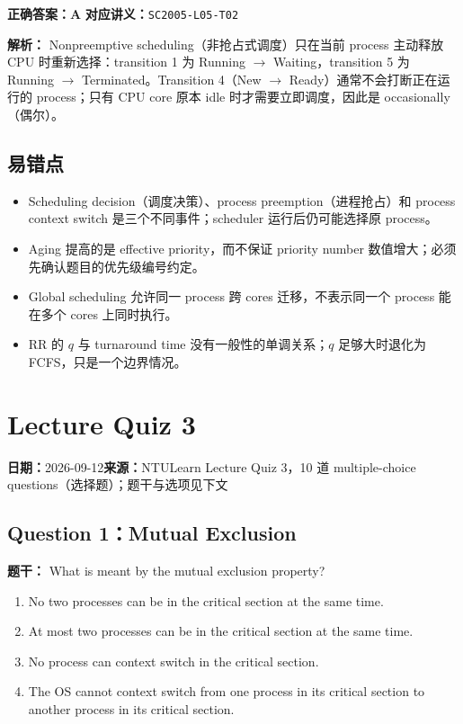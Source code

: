 \documentclass[11pt,a4paper,fontset=fandol]{ctexart}
\renewcommand{\exercisequestion}[2]{%
  \Needspace{5\baselineskip}%
  \subsection{#2}\label{exercise:#1}%
}
\renewcommand{\exercisemeta}[5]{%
  {\small\textbf{日期：}#2\quad\textbf{来源：}#3\par}%
}
\renewenvironment{checkedsolution}
  {\par\nopagebreak[4]\textbf{解析：}\ignorespaces}
  {\par}
\begin{document}
\textbf{正确答案：A}\qquad
\textbf{对应讲义：}\texttt{SC2005-L05-T02}

\begin{checkedsolution}
Nonpreemptive scheduling（非抢占式调度）只在当前 process 主动释放 CPU 时重新选择：transition 1 为 Running $\rightarrow$ Waiting，transition 5 为 Running $\rightarrow$ Terminated。Transition 4（New $\rightarrow$ Ready）通常不会打断正在运行的 process；只有 CPU core 原本 idle 时才需要立即调度，因此是 occasionally（偶尔）。
\end{checkedsolution}

\subsection{易错点}

\begin{itemize}
  \item Scheduling decision（调度决策）、process preemption（进程抢占）和 process context switch 是三个不同事件；scheduler 运行后仍可能选择原 process。
  \item Aging 提高的是 effective priority，而不保证 priority number 数值增大；必须先确认题目的优先级编号约定。
  \item Global scheduling 允许同一 process 跨 cores 迁移，不表示同一个 process 能在多个 cores 上同时执行。
  \item RR 的 $q$ 与 turnaround time 没有一般性的单调关系；$q$ 足够大时退化为 FCFS，只是一个边界情况。
\end{itemize}

\section{Lecture Quiz 3}
\label{homework:SC2005-HW03}

\exercisemeta
  {SC2005-HW03}
  {2026-09-12}
  {NTULearn Lecture Quiz 3，10 道 multiple-choice questions（选择题）；题干与选项见下文}
  {已完成，并根据平台满分反馈逐题核对}
  {是（2026-09-12）}

\exercisequestion{SC2005-HW03-Q01}{Question 1：Mutual Exclusion}

\textbf{题干：} What is meant by the mutual exclusion property?

\begin{enumerate}[label=\Alph*.,leftmargin=2.4em]
  \item No two processes can be in the critical section at the same time.
  \item At most two processes can be in the critical section at the same time.
  \item No process can context switch in the critical section.
  \item The OS cannot context switch from one process in its critical section to another process in its critical section.
\end{enumerate}
\end{document}
